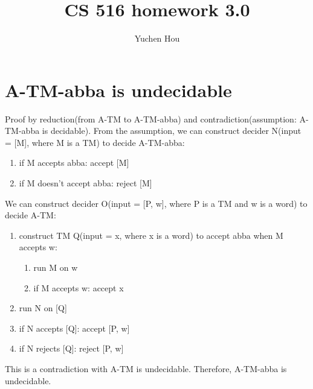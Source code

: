 \documentclass{article}
\begin{document}
\lstset{language=python, tabsize=4}
\title{CS 516 homework 3.0}
\author{Yuchen Hou}
\maketitle

\section{A-TM-abba is undecidable}
Proof by reduction(from A-TM to A-TM-abba) and contradiction(assumption: A-TM-abba is decidable). From the assumption, we can construct decider N(input = [M], where M is a TM) to decide A-TM-abba:
\begin{enumerate}
	\item if M accepts abba: accept [M]
	\item if M doesn't accept abba: reject [M]
\end{enumerate}
We can construct decider O(input = [P, w], where P is a TM and w is a word) to decide A-TM:
\begin{enumerate}
	\item construct TM Q(input = x, where x is a word) to accept abba when M accepts w:
	\begin{enumerate}
		\item run M on w
		\item if M accepts w: accept x
	\end{enumerate}
	\item run N on [Q]
	\item if N accepts [Q]: accept [P, w]
	\item if N rejects [Q]: reject [P, w]
\end{enumerate}
This is a contradiction with A-TM is undecidable. Therefore, A-TM-abba is undecidable.
\end{document}
